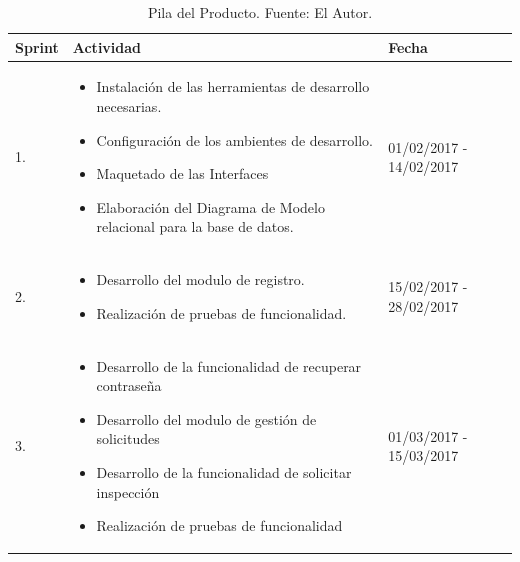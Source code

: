 \begin{table}[H]	
\begin{center}
\begin{tabular}{ | m{2cm} | m{9cm}| m{3cm}| } 
 \hline
 Sprint & Actividad & Fecha \\
 \hline
 1. 
 & 
 \begin{itemize}
 	\item Instalación de las herramientas de desarrollo necesarias.
 	\item Configuración de los ambientes de desarrollo.
 	\item Maquetado de las Interfaces
 	\item Elaboración del Diagrama de Modelo relacional para la base de datos.
 \end{itemize}
 & 
 01/02/2017 - 14/02/2017\\
 \hline

 2. 
 & 
 \begin{itemize}
 	\item Desarrollo del modulo de registro.
 	\item Realización de pruebas de funcionalidad.
 \end{itemize}
 & 
 15/02/2017 - 28/02/2017\\
 \hline

 3.
 & 
 \begin{itemize}
 	\item Desarrollo de la funcionalidad de recuperar contraseña
 	\item Desarrollo del modulo de gestión de solicitudes
 	\item Desarrollo de la funcionalidad de solicitar inspección
 	\item Realización de pruebas de funcionalidad
 \end{itemize}
 & 
 01/03/2017 - 15/03/2017\\
 \hline
 

 


\end{tabular}
\caption{Pila del Producto. Fuente: El Autor.}
\label{Tabla:15}
\end{center}
\end{table}	

\newpage

